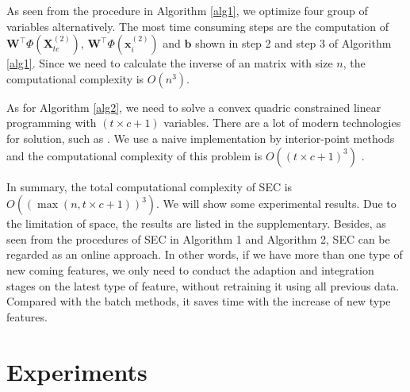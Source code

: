 \documentclass[10pt,journal,compsoc]{IEEEtran}
\begin{document}
As seen from the procedure in Algorithm \ref{alg1}, we optimize four group of variables alternatively. The most time consuming steps are the computation of $\mathbf{W}^\top \Phi(\mathbf{X}_{te}^{(2)})$, $\mathbf{W}^\top \Phi(\mathbf{x}_i^{(2)})$ and $\mathbf{b}$ shown in step 2 and step 3 of Algorithm \ref{alg1}. Since we need to calculate the inverse of an matrix with size $n$, the computational complexity is $O(n^3)$.

As for Algorithm \ref{alg2}, we need to solve a convex quadric constrained linear programming with $(t\times c+1)$ variables. There are a lot of modern technologies for solution, such as \cite{cvx}. We use a naive implementation by interior-point methods and the computational complexity of this problem is
$O((t\times c+1)^3)$ \cite{Boyd:2004}.

In summary, the total computational complexity of SEC is $O((\max(n,t\times c+1))^3)$. We will show some experimental results. Due to the limitation of space, the results are listed in the supplementary. Besides, as seen from the procedures of SEC in Algorithm 1 and Algorithm 2, SEC can be regarded as an online approach. In other words, if we have more than one type of new coming features, we only need to conduct the adaption and integration stages on the latest type of feature, without retraining it using all previous data. Compared with the batch methods, it saves time with the increase of new type features.

\section{Experiments}
\label{sec_exp}
\end{document}
